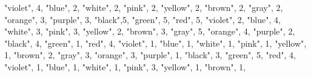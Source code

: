 \documentclass[
]{article}
\newenvironment{Shaded}{\begin{snugshade}}{\end{snugshade}}
\newcommand{\DecValTok}[1]{\textcolor[rgb]{0.00,0.00,0.81}{#1}}
\newcommand{\NormalTok}[1]{#1}
\newcommand{\StringTok}[1]{\textcolor[rgb]{0.31,0.60,0.02}{#1}}
\begin{document}
\begin{Shaded}
\begin{Highlighting}[]
  \StringTok{"violet"}\NormalTok{, }\DecValTok{4}\NormalTok{,}
  \StringTok{"blue"}\NormalTok{, }\DecValTok{2}\NormalTok{, }
  \StringTok{"white"}\NormalTok{, }\DecValTok{2}\NormalTok{,}
  \StringTok{"pink"}\NormalTok{, }\DecValTok{2}\NormalTok{,}
  \StringTok{"yellow"}\NormalTok{, }\DecValTok{2}\NormalTok{,}
  \StringTok{"brown"}\NormalTok{, }\DecValTok{2}\NormalTok{,}
  \StringTok{"gray"}\NormalTok{, }\DecValTok{2}\NormalTok{,}
  \StringTok{"orange"}\NormalTok{, }\DecValTok{3}\NormalTok{,}
  \StringTok{"purple"}\NormalTok{, }\DecValTok{3}\NormalTok{,}
    \StringTok{"black"}\NormalTok{,}\DecValTok{5}\NormalTok{,}
  \StringTok{"green"}\NormalTok{, }\DecValTok{5}\NormalTok{,}
  \StringTok{"red"}\NormalTok{, }\DecValTok{5}\NormalTok{,}
  \StringTok{"violet"}\NormalTok{, }\DecValTok{2}\NormalTok{,}
  \StringTok{"blue"}\NormalTok{, }\DecValTok{4}\NormalTok{,}
  \StringTok{"white"}\NormalTok{, }\DecValTok{3}\NormalTok{,}
  \StringTok{"pink"}\NormalTok{, }\DecValTok{3}\NormalTok{,}
  \StringTok{"yellow"}\NormalTok{, }\DecValTok{2}\NormalTok{,}
  \StringTok{"brown"}\NormalTok{, }\DecValTok{3}\NormalTok{,}
  \StringTok{"gray"}\NormalTok{, }\DecValTok{5}\NormalTok{,}
  \StringTok{"orange"}\NormalTok{, }\DecValTok{4}\NormalTok{,}
  \StringTok{"purple"}\NormalTok{, }\DecValTok{2}\NormalTok{, }
    \StringTok{"black"}\NormalTok{, }\DecValTok{4}\NormalTok{,}
  \StringTok{"green"}\NormalTok{, }\DecValTok{1}\NormalTok{,}
  \StringTok{"red"}\NormalTok{, }\DecValTok{4}\NormalTok{,}
  \StringTok{"violet"}\NormalTok{, }\DecValTok{1}\NormalTok{,}
  \StringTok{"blue"}\NormalTok{, }\DecValTok{1}\NormalTok{,}
  \StringTok{"white"}\NormalTok{, }\DecValTok{1}\NormalTok{,}
  \StringTok{"pink"}\NormalTok{, }\DecValTok{1}\NormalTok{,}
  \StringTok{"yellow"}\NormalTok{, }\DecValTok{1}\NormalTok{,}
  \StringTok{"brown"}\NormalTok{, }\DecValTok{2}\NormalTok{,}
  \StringTok{"gray"}\NormalTok{, }\DecValTok{3}\NormalTok{,}
  \StringTok{"orange"}\NormalTok{, }\DecValTok{3}\NormalTok{,}
  \StringTok{"purple"}\NormalTok{, }\DecValTok{1}\NormalTok{,}
    \StringTok{"black"}\NormalTok{, }\DecValTok{3}\NormalTok{,}
  \StringTok{"green"}\NormalTok{, }\DecValTok{5}\NormalTok{,}
  \StringTok{"red"}\NormalTok{, }\DecValTok{4}\NormalTok{,}
  \StringTok{"violet"}\NormalTok{, }\DecValTok{1}\NormalTok{,}
  \StringTok{"blue"}\NormalTok{, }\DecValTok{1}\NormalTok{,}
  \StringTok{"white"}\NormalTok{, }\DecValTok{1}\NormalTok{,}
  \StringTok{"pink"}\NormalTok{, }\DecValTok{3}\NormalTok{,}
  \StringTok{"yellow"}\NormalTok{, }\DecValTok{1}\NormalTok{,}
  \StringTok{"brown"}\NormalTok{, }\DecValTok{1}\NormalTok{,}

\end{Highlighting}
\end{Shaded}
\end{document}
